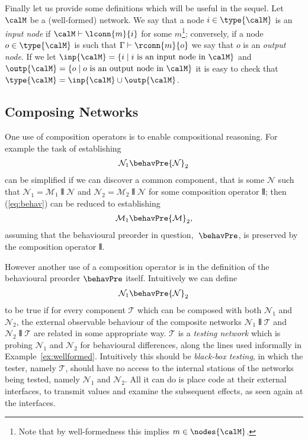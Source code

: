 \documentclass{LMCS}
\begin{document}
Finally let us provide some definitions which will be useful in the sequel.
Let $\calM$ be a (well-formed) network. We say that a 
node $i \in \type{\calM}$ is an \emph{input node} if $\calM \vdash 
\lconn{m}{i}$ for some $m$\footnote{Note that by well-formedness this implies 
$m \in \nodes{\calM}$.}; conversely, if a node $o \in \type{\calM}$ is 
such that $\Gamma \vdash \rconn{m}{o}$ we say 
that $o$ is an \emph{output node}. If we let $\inp{\calM} = 
\{i \;|\; i \mbox{ is an input node in  } \calM\}$ and $\outp{\calM} = 
\{o \;|\; o \mbox{ is an output node in } \calM\}$ it is easy to check that 
$\type{\calM} = \inp{\calM} \cup \outp{\calM}$.




\subsection{Composing Networks}
\label{sec:comp.net}
One use of composition operators is to enable compositional reasoning. For example the task of establishing
\begin{align}\label{eq:behav}
  {\mathcal N}_1 \behavPre {\mathcal N}_2
\end{align}
can be simplified if we can discover a common component, that is some ${\mathcal N}$ such that 
\begin{math}
   {\mathcal N}_1 =  {\mathcal M}_1 \interleave  {\mathcal N}
\end{math}
and 
\begin{math}
   {\mathcal N}_2 =  {\mathcal M}_2 \interleave  {\mathcal N}
\end{math}
for some composition operator $\interleave$; then (\ref{eq:behav}) can be reduced to establishing 
\begin{align*}
  {\mathcal M}_1 \behavPre {\mathcal M}_2,
\end{align*}
assuming that the behavioural preorder in question, $\;\behavPre$, is preserved by the composition operator $\interleave$. 

However another use of a composition operator is in the definition of the behavioural preorder $\behavPre$ itself.
Intuitively we can define 
\begin{align}
  {\mathcal N}_1 \behavPre {\mathcal N}_2
\end{align}
to be true if for every component ${\mathcal T}$ which can be composed
with both $ {\mathcal N}_1$ and ${\mathcal N}_2$, the external
observable behaviour of the composite networks ${\mathcal N}_1
\interleave {\mathcal T}$ and ${\mathcal N}_2 \interleave {\mathcal
  T}$ are related in some appropriate way. ${\mathcal T}$
is a \emph{testing network} which is probing ${\mathcal N}_1$ and
${\mathcal N}_2$ for behavioural differences, along the lines used informally in 
Example~\ref{ex:wellformed}.  Intuitively this should
be \emph{black-box testing}, in which the tester, namely $\mathcal T$,
should have no access to the internal stations of the networks being
tested, namely ${\mathcal N}_1$ and ${\mathcal N}_2$. All it can do is
place code at their external interfaces,  to transmit values and
examine the subsequent effects, as seen again at the interfaces.  
\end{document}
